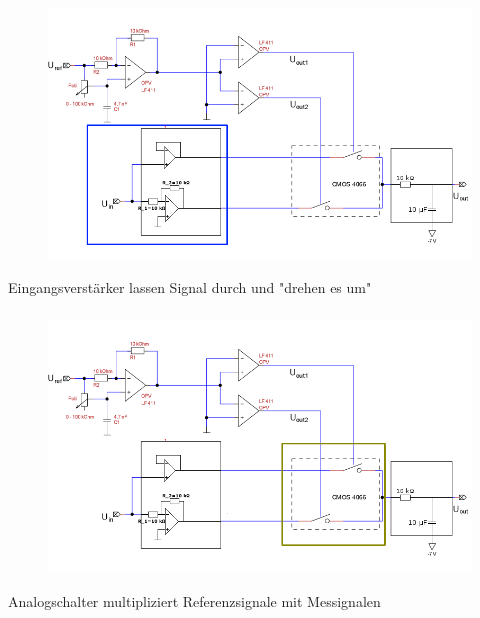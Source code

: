 \begin{frame}
    \frametitle{}
    \framesubtitle{}
    \begin{figure}[H]
    \begin{center}
            \includegraphics[scale=0.4]{./img/schaltung/gesamt_eing.png}
    \end{center}
    \end{figure}
    \begin{block}{}
        Eingangsverstärker lassen Signal durch und "drehen es um"
    \end{block}
\end{frame}
\begin{frame}
    \frametitle{}
    \framesubtitle{}
    \begin{figure}[H]
    \begin{center}
            \includegraphics[scale=0.4]{./img/schaltung/gesamt_analog.png}
    \end{center}
    \end{figure}
    \begin{block}{}
        Analogschalter multipliziert Referenzsignale mit Messignalen
    \end{block}
\end{frame}

